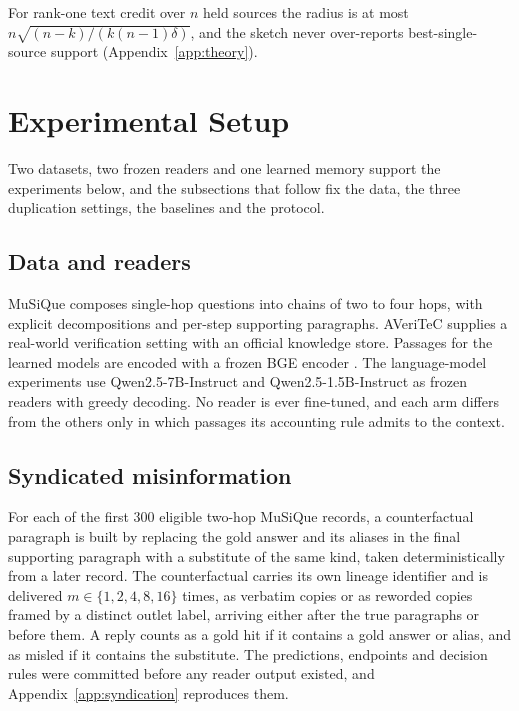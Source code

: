 \documentclass{article}
\begin{document}
For rank-one text credit over $n$ held sources the radius is at most
$n\sqrt{(n-k)/(k(n-1)\delta)}$, and the sketch never over-reports
best-single-source support (Appendix~\ref{app:theory}).

\section{Experimental Setup}
\label{sec:setup}

Two datasets, two frozen readers and one learned memory support the experiments
below, and the subsections that follow fix the data, the three duplication
settings, the baselines and the protocol.

\subsection{Data and readers}
MuSiQue \citep{trivedi2022musique} composes single-hop questions into chains of
two to four hops, with explicit decompositions and per-step supporting
paragraphs. AVeriTeC \citep{schlichtkrull2023averitec,
schlichtkrull2024sharedtask} supplies a real-world verification setting with
an official knowledge store. Passages for the learned models are encoded
with a frozen BGE encoder \citep{xiao2023bge}. The language-model experiments use
Qwen2.5-7B-Instruct and Qwen2.5-1.5B-Instruct \citep{qwen2025qwen25} as frozen
readers with greedy decoding. No reader is ever fine-tuned, and each arm differs
from the others only in which passages its accounting rule admits to the context.

\subsection{Syndicated misinformation}
For each of the first $300$ eligible two-hop MuSiQue records, a counterfactual
paragraph is built by replacing the gold answer and its aliases in the final
supporting paragraph with a substitute of the same kind, taken deterministically
from a later record. The counterfactual carries its own lineage identifier and
is delivered $m \in \{1, 2, 4, 8, 16\}$ times, as verbatim copies or as reworded
copies framed by a distinct outlet label, arriving either after the true
paragraphs or before them. A reply counts as a gold hit if it contains a gold
answer or alias, and as misled if it contains the substitute. The predictions,
endpoints and decision rules were committed before any reader output existed,
and Appendix~\ref{app:syndication} reproduces them.
\end{document}
